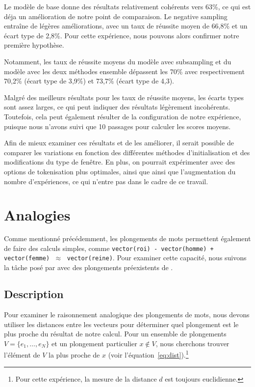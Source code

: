 \documentclass[12pt]{article}
\begin{document}
Le modèle de base donne des résultats relativement cohérents vers 63\%, ce qui est déja un amélioration de notre point de comparaison. Le negative sampling entraîne de légères améliorations, avec un taux de réussite moyen de 66{,}8\% et un écart type de 2{,}8\%. Pour cette expérience, nous pouvons alors confirmer notre première hypothèse. 

Notamment, les taux de réussite moyens du modèle avec subsampling et du modèle avec les deux méthodes ensemble dépassent les 70\% avec respectivement 70{,}2\% (écart type de 3{,}9\%) et 73{,}7\% (écart type de 4{,}3).

Malgré des meilleurs résultats pour les taux de réussite moyens, les écarts types sont assez larges, ce qui peut indiquer des résultats légèrement incohérents. Toutefois, cela peut également résulter de la configuration de notre expérience, puisque nous n'avons suivi que 10 passages pour calculer les scores moyens. 

Afin de mieux examiner ces résultats et de les améliorer, il serait possible de comparer les variations en fonction des différentes méthodes d'initialisation et des modifications du type de fenêtre. En plus, on pourrait expérimenter avec des options de tokenisation plus optimales, ainsi que ainsi que l'augmentation du nombre d'expériences, ce qui n’entre pas dans le cadre de ce travail.

\section{Analogies} \label{analogies}

Comme mentionné précédemment, les plongements de mots permettent également de faire des calculs simples, comme \texttt{vector(roi) - vector(homme) + vector(femme)} $\;\approx\;$ \texttt{vector(reine)}. Pour examiner cette capacité, nous suivons la tâche posé par \cite{DBLP:journals/corr/abs-1301-3781} avec des plongements préexistents de \cite{fares-etal-2017-word}.  

\subsection{Description} \label{description-2}

Pour examiner le raisonnement analogique des plongements de mots, nous devons utiliser les distances entre les vecteurs pour déterminer quel plongement est le plus proche du résultat de notre calcul. Pour un ensemble de plongements $V = \{e_1, \dotsc, e_N\}$ et un plongement particulier $x \notin V$, nous cherchons trouver l'élément de $ V $ la plus proche de $x$ (voir l'équation~\ref{eq:dist}).\footnote{Pour cette expérience, la mesure de la distance $d$ est toujours euclidienne.}
\end{document}

